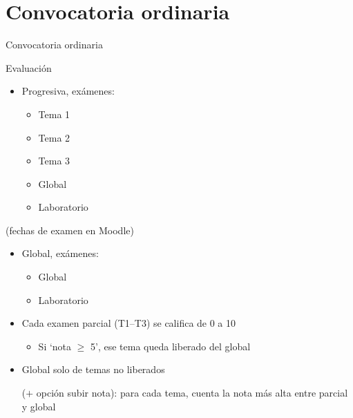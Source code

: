\documentclass[aspectratio=169, usenames,svgnames,dvipsnames]{beamer}
\begin{document}

\section*{Convocatoria ordinaria}

\begin{frame}{Convocatoria ordinaria}

    \begin{minipage}[t]{0.34\linewidth}
    \alert{Evaluación}
    \vspace{3mm}
    \begin{itemize}
    \item \alert{Progresiva}, exámenes:
        \begin{itemize}
        \item Tema 1
        \item Tema 2
        \item Tema 3
        \item Global
        \item Laboratorio
        \end{itemize}
    \end{itemize}
    (fechas de examen en Moodle)
    \begin{itemize}
    \item \alert{Global}, exámenes:
        \begin{itemize}
        \item Global
        \item Laboratorio
        \end{itemize}
    \end{itemize}
    \end{minipage}
    \hfill%
    \begin{minipage}[t]{0.65\linewidth}
    \pause
    \vspace{13.2mm}
        \begin{itemize}
        \item Cada examen parcial (T1–T3) se califica de 0 a 10
            \begin{itemize}
            \item {\normalsize Si `nota $\geq$ 5', ese \alert{tema queda liberado} del global}
            \end{itemize}
        \vspace{1.2mm}
        \item Global solo de temas no liberados 
        
        ($+$ \alert{opción subir nota}): para cada tema, cuenta la nota más alta entre parcial y global
        \end{itemize}    
    \end{minipage}

\end{frame}
\end{document}

